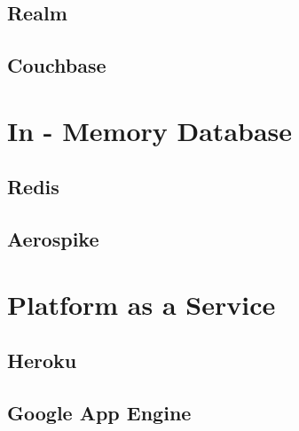 \subsection{Realm}
\subsection{Couchbase}

\section{In - Memory Database}

\subsection{Redis}
\subsection{Aerospike}


\section{Platform as a Service}
\subsection{Heroku}
\subsection{Google App Engine}